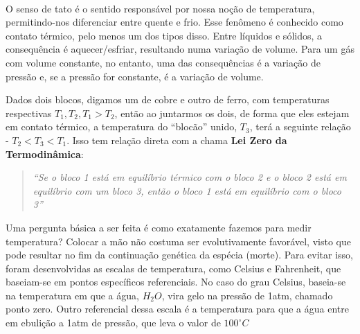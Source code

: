 \documentclass{article}
\begin{document}
\paragraph{} O senso de tato é o sentido responsável por nossa noção de temperatura, permitindo-nos diferenciar
entre quente e frio. Esse fenômeno é conhecido como contato térmico, pelo menos um dos tipos disso. Entre líquidos e sólidos,
a consequência é aquecer/esfriar, resultando numa variação de volume. Para um gás com volume constante, no entanto, uma
das consequências é a variação de pressão e, se a pressão for constante, é a variação de volume.

Dados dois blocos, digamos um de cobre e outro de ferro, com temperaturas respectivas \(T_{1}, T_{2}, T_{1} > T_{2}\), então ao
juntarmos os dois, de forma que eles estejam em contato térmico, a temperatura do ``blocão'' unido, \(T_{3}\), terá a seguinte relação -
\(T_{2} < T_{3} < T_{1}\). Isso tem relação direta com a chama \textbf{Lei Zero da Termodinâmica}:
\begin{quote}
  \textit{``Se o bloco 1 está em equilíbrio térmico com o bloco 2 e o bloco 2 está em equilíbrio com um bloco 3, então
  o bloco 1 está em equilíbrio com o bloco 3''}
\end{quote}
Uma pergunta básica a ser feita é como exatamente fazemos para medir temperatura? Colocar a mão não costuma ser evolutivamente favorável, visto que pode resultar
no fim da continuação genética da espécia (morte). Para evitar isso, foram desenvolvidas as escalas de temperatura, como Celsius e Fahrenheit, que baseiam-se 
em pontos específicos referenciais. No caso do grau Celsius, baseia-se na temperatura em que a água, \(H_{2}O\), vira gelo na pressão de 1atm, chamado ponto zero.
Outro referencial dessa escala é a temperatura para que a água entre em ebulição a 1atm de pressão, que leva o valor de \(100^{\circ{}}C\)
\end{document}
